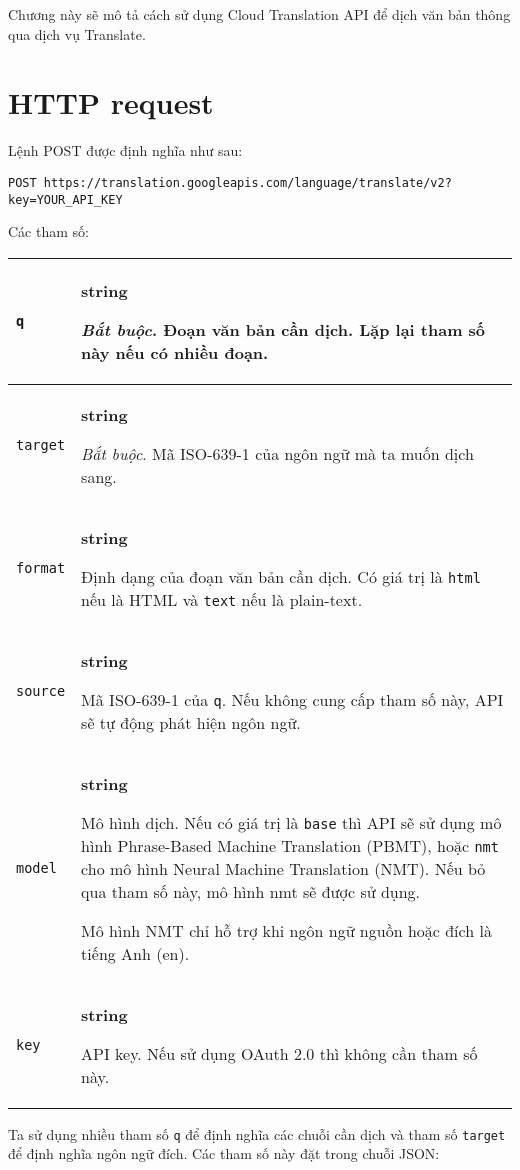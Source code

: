 \documentclass[../thesis.tex]{subfiles}
\begin{document}
Chương này sẽ mô tả cách sử dụng Cloud Translation API để dịch văn bản thông qua dịch vụ Translate.

\section{HTTP request}

Lệnh POST được định nghĩa như sau:

\begin{lstlisting}[style=link]
POST https://translation.googleapis.com/language/translate/v2?key=YOUR_API_KEY
\end{lstlisting}

Các tham số:

\begin{center}
\begin{tabularx}{\textwidth}{|p{}|X|}
\hline
\lstinline{q} & \textbf{string}

\textit{Bắt buộc}. Đoạn văn bản cần dịch. Lặp lại tham số này nếu có nhiều đoạn.\\
\hline
\lstinline{target} & \textbf{string}

\textit{Bắt buộc}. Mã ISO-639-1 của ngôn ngữ mà ta muốn dịch sang.\\
\hline
\lstinline{format} & \textbf{string}

Định dạng của đoạn văn bản cần dịch. Có giá trị là \lstinline{html} nếu là HTML và \lstinline{text} nếu là plain-text.\\
\hline
\lstinline{source} & \textbf{string}

Mã ISO-639-1 của \lstinline{q}. Nếu không cung cấp tham số này, API sẽ tự động phát hiện ngôn ngữ.\\
\hline
\lstinline{model} & \textbf{string}

Mô hình dịch. Nếu có giá trị là \lstinline{base} thì API sẽ sử dụng mô hình Phrase-Based Machine Translation (PBMT), hoặc \lstinline{nmt} cho mô hình Neural Machine Translation (NMT). Nếu bỏ qua tham số này, mô hình nmt sẽ được sử dụng.

Mô hình NMT chỉ hỗ trợ khi ngôn ngữ nguồn hoặc đích là tiếng Anh (en).\\
\hline
\lstinline{key} & \textbf{string}

API key. Nếu sử dụng OAuth 2.0 thì không cần tham số này.\\
\hline
\end{tabularx}
\end{center}

Ta sử dụng nhiều tham số \lstinline{q} để định nghĩa các chuỗi cần dịch và tham số \lstinline{target} để định nghĩa ngôn ngữ đích. Các tham số này đặt trong chuỗi JSON:
\end{document}
